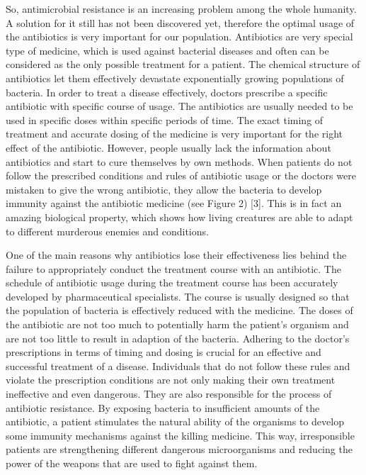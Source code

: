 So, antimicrobial resistance is an increasing problem among the whole humanity. A solution for it still has not been discovered yet, therefore the optimal usage of the antibiotics is very important for our population. Antibiotics are very special type of medicine, which is used against bacterial diseases and often can be considered as the only possible treatment for a patient. The chemical structure of antibiotics let them effectively devastate exponentially growing populations of bacteria. In order to treat a disease effectively, doctors prescribe a specific antibiotic with specific course of usage. The antibiotics are usually needed to be used in specific doses within specific periods of time. The exact timing of treatment and accurate dosing of the medicine is very important for the right effect of the antibiotic. However, people usually lack the information about antibiotics and start to cure themselves by own methods. When patients do not follow the prescribed conditions and rules of antibiotic usage or the doctors were mistaken to give the wrong antibiotic, they allow the bacteria to develop immunity against the antibiotic medicine (see Figure 2) [3]. This is in fact an amazing biological property, which shows how living creatures are able to adapt to different murderous enemies and conditions.

One of the main reasons why antibiotics lose their effectiveness lies behind the failure to appropriately conduct the treatment course with an antibiotic. The schedule of antibiotic usage during the treatment course has been accurately developed by pharmaceutical specialists. The course is usually designed so that the population of bacteria is effectively reduced with the medicine. The doses of the antibiotic are not too much to potentially harm the patient’s organism and are not too little to result in adaption of the bacteria. Adhering to the doctor’s prescriptions in terms of timing and dosing is crucial for an effective and successful treatment of a disease. Individuals that do not follow these rules and violate the prescription conditions are not only making their own treatment ineffective and even dangerous. They are also responsible for the process of antibiotic resistance. By exposing bacteria to insufficient amounts of the antibiotic, a patient stimulates the natural ability of the organisms to develop some immunity mechanisms against the killing medicine. This way, irresponsible patients are strengthening different dangerous microorganisms and reducing the power of the weapons that are used to fight against them.

